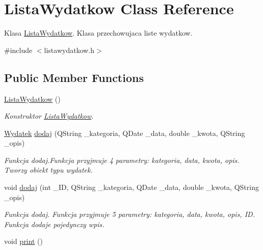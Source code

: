 \hypertarget{class_lista_wydatkow}{}\section{Lista\+Wydatkow Class Reference}
\label{class_lista_wydatkow}


Klasa \hyperlink{class_lista_wydatkow}{Lista\+Wydatkow}. Klasa przechowujaca liste wydatkow.  




{\ttfamily \#include $<$listawydatkow.\+h$>$}

\subsection*{Public Member Functions}
\begin{DoxyCompactItemize}
\item 
\hypertarget{class_lista_wydatkow_a4eb91fdc04f1838878c5b077e0de415a}{}\hyperlink{class_lista_wydatkow_a4eb91fdc04f1838878c5b077e0de415a}{Lista\+Wydatkow} ()\label{class_lista_wydatkow_a4eb91fdc04f1838878c5b077e0de415a}

\begin{DoxyCompactList}\small\item\em Konstruktor \hyperlink{class_lista_wydatkow}{Lista\+Wydatkow}. \end{DoxyCompactList}\item 
\hyperlink{class_wydatek}{Wydatek} \hyperlink{class_lista_wydatkow_a5b6dbb32cc0b8af9bc310204f021ba93}{dodaj} (Q\+String \+\_\+kategoria, Q\+Date \+\_\+data, double \+\_\+kwota, Q\+String \+\_\+opis)
\begin{DoxyCompactList}\small\item\em Funkcja dodaj.\+Funkcja przyjmuje 4 parametry\+: kategoria, data, kwota, opis. Tworzy obiekt typu wydatek. \end{DoxyCompactList}\item 
void \hyperlink{class_lista_wydatkow_a028cb8e2868891df99496e6df8fbd7fa}{dodaj} (int \+\_\+\+I\+D, Q\+String \+\_\+kategoria, Q\+Date \+\_\+data, double \+\_\+kwota, Q\+String \+\_\+opis)
\begin{DoxyCompactList}\small\item\em Funkcja dodaj. Funkcja przyjmuje 5 parametry\+: kategoria, data, kwota, opis, I\+D. Funkcja dodaje pojedynczy wpis. \end{DoxyCompactList}\item 
\hypertarget{class_lista_wydatkow_a78bd61ad9ab795b9808b832ab61ac1e9}{}void \hyperlink{class_lista_wydatkow_a78bd61ad9ab795b9808b832ab61ac1e9}{print} ()\label{class_lista_wydatkow_a78bd61ad9ab795b9808b832ab61ac1e9}


\end{DoxyCompactItemize}

